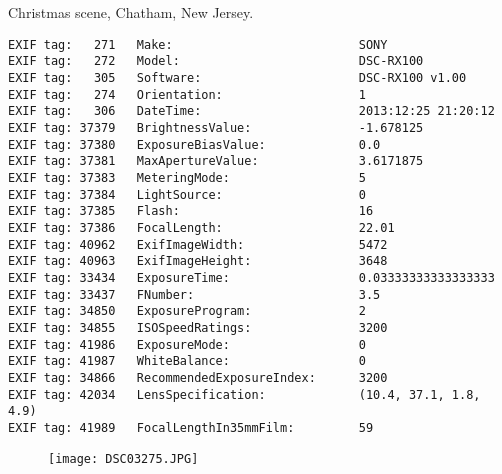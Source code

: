 \section{\protect{}}
\noindent Christmas scene, Chatham, New Jersey.
\noindent
\begin{lstlisting}
EXIF tag:   271   Make:                          SONY
EXIF tag:   272   Model:                         DSC-RX100
EXIF tag:   305   Software:                      DSC-RX100 v1.00
EXIF tag:   274   Orientation:                   1
EXIF tag:   306   DateTime:                      2013:12:25 21:20:12
EXIF tag: 37379   BrightnessValue:               -1.678125
EXIF tag: 37380   ExposureBiasValue:             0.0
EXIF tag: 37381   MaxApertureValue:              3.6171875
EXIF tag: 37383   MeteringMode:                  5
EXIF tag: 37384   LightSource:                   0
EXIF tag: 37385   Flash:                         16
EXIF tag: 37386   FocalLength:                   22.01
EXIF tag: 40962   ExifImageWidth:                5472
EXIF tag: 40963   ExifImageHeight:               3648
EXIF tag: 33434   ExposureTime:                  0.03333333333333333
EXIF tag: 33437   FNumber:                       3.5
EXIF tag: 34850   ExposureProgram:               2
EXIF tag: 34855   ISOSpeedRatings:               3200
EXIF tag: 41986   ExposureMode:                  0
EXIF tag: 41987   WhiteBalance:                  0
EXIF tag: 34866   RecommendedExposureIndex:      3200
EXIF tag: 42034   LensSpecification:             (10.4, 37.1, 1.8, 4.9)
EXIF tag: 41989   FocalLengthIn35mmFilm:         59

\end{lstlisting}
\clearpage
\begin{figure}
\raggedleft
\texttt{[image: DSC03275.JPG]}
\end{figure}


\clearpage
